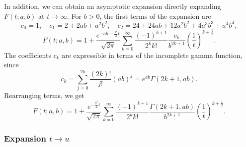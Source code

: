 \documentclass[10pt,a4paper,oneside]{article}
\numberwithin{equation}{section}
\begin{document}
\begin{appendices}
In addition, we can obtain an asymptotic expansion directly expanding $F(t; a, b)$ at $t \to \infty$. For $b > 0$, the first terms of the expansion are
\begin{equation}
c_0 = 1, \quad c_1 = 2 + 2ab + a^2 b^2, \quad c_2 = 24 + 24ab + 12a^2b^2 + 4a^3b^3 + a^4b^4,
\end{equation}
\begin{equation}
F(t; a, b) = 1 + \frac{e^{-ab - \frac{b^2}{2}t}}{\sqrt{2\pi}}\sum_{k=0}^{\infty}\frac{(-1)^{k+1}}{2^k k!}\frac{c_k}{b^{2k+1}}\left(\frac{1}{t}\right)^{k+\frac{1}{2}}.
\end{equation}
The coefficients $c_k$ are expressible in terms of the incomplete gamma function, since
\begin{equation*}
c_k = \sum_{j=0}^{2k}\frac{(2k)!}{j!}(ab)^j = e^{ab}\Gamma(2k+1, ab).
\end{equation*}
Rearranging terms, we get
\begin{equation}\label{phi_expansion_at_inf}
F(t; a, b) = 1 + \frac{e^{- \frac{b^2}{2}t}}{\sqrt{2\pi}}\sum_{k=0}^{\infty}\frac{(-1)^{k+1}}{2^k k!}\frac{\Gamma(2k+1, ab)}{b^{2k+1}}\left(\frac{1}{t}\right)^{k+\frac{1}{2}}.
\end{equation}

\subsubsection{Expansion $t \to u$}


\end{appendices}
\end{document}
